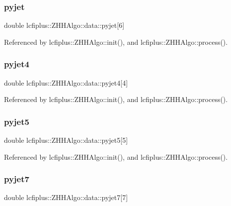 \subsubsection{pyjet}
{\footnotesize\ttfamily double lcfiplus\+::\+Z\+H\+H\+Algo\+::data\+::pyjet[6]}



Referenced by lcfiplus\+::\+Z\+H\+H\+Algo\+::init(), and lcfiplus\+::\+Z\+H\+H\+Algo\+::process().

\mbox{\label{structlcfiplus_1_1ZHHAlgo_1_1data_ad7573d9baad7f418bc7e521acb5b1c5e}} 
\subsubsection{pyjet4}
{\footnotesize\ttfamily double lcfiplus\+::\+Z\+H\+H\+Algo\+::data\+::pyjet4[4]}



Referenced by lcfiplus\+::\+Z\+H\+H\+Algo\+::init(), and lcfiplus\+::\+Z\+H\+H\+Algo\+::process().

\mbox{\label{structlcfiplus_1_1ZHHAlgo_1_1data_a5b30c6406da39ff1027b9e58cca2695c}} 
\subsubsection{pyjet5}
{\footnotesize\ttfamily double lcfiplus\+::\+Z\+H\+H\+Algo\+::data\+::pyjet5[5]}



Referenced by lcfiplus\+::\+Z\+H\+H\+Algo\+::init(), and lcfiplus\+::\+Z\+H\+H\+Algo\+::process().

\mbox{\label{structlcfiplus_1_1ZHHAlgo_1_1data_a539bc41d65a221626e438a43376b8582}} 
\subsubsection{pyjet7}
{\footnotesize\ttfamily double lcfiplus\+::\+Z\+H\+H\+Algo\+::data\+::pyjet7[7]}



